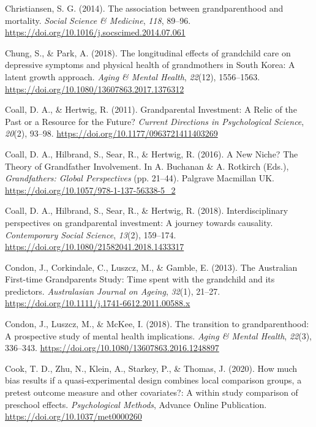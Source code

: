 \documentclass[
  english,
  man,floatsintext]{apa7}
\begin{document}
\leavevmode\hypertarget{ref-christiansenAssociationGrandparenthoodMortality2014}{}%
Christiansen, S. G. (2014). The association between grandparenthood and mortality. \emph{Social Science \& Medicine}, \emph{118}, 89--96. \url{https://doi.org/10.1016/j.socscimed.2014.07.061}

\leavevmode\hypertarget{ref-chungLongitudinalEffectsGrandchild2018}{}%
Chung, S., \& Park, A. (2018). The longitudinal effects of grandchild care on depressive symptoms and physical health of grandmothers in South Korea: A latent growth approach. \emph{Aging \& Mental Health}, \emph{22}(12), 1556--1563. \url{https://doi.org/10.1080/13607863.2017.1376312}

\leavevmode\hypertarget{ref-coallGrandparentalInvestmentRelic2011}{}%
Coall, D. A., \& Hertwig, R. (2011). Grandparental Investment: A Relic of the Past or a Resource for the Future? \emph{Current Directions in Psychological Science}, \emph{20}(2), 93--98. \url{https://doi.org/10.1177/0963721411403269}

\leavevmode\hypertarget{ref-coallNewNicheTheory2016}{}%
Coall, D. A., Hilbrand, S., Sear, R., \& Hertwig, R. (2016). A New Niche? The Theory of Grandfather Involvement. In A. Buchanan \& A. Rotkirch (Eds.), \emph{Grandfathers: Global Perspectives} (pp. 21--44). Palgrave Macmillan UK. \url{https://doi.org/10.1057/978-1-137-56338-5_2}

\leavevmode\hypertarget{ref-coallInterdisciplinaryPerspectivesGrandparental2018}{}%
Coall, D. A., Hilbrand, S., Sear, R., \& Hertwig, R. (2018). Interdisciplinary perspectives on grandparental investment: A journey towards causality. \emph{Contemporary Social Science}, \emph{13}(2), 159--174. \url{https://doi.org/10.1080/21582041.2018.1433317}

\leavevmode\hypertarget{ref-condonAustralianFirsttimeGrandparents2013}{}%
Condon, J., Corkindale, C., Luszcz, M., \& Gamble, E. (2013). The Australian First-time Grandparents Study: Time spent with the grandchild and its predictors. \emph{Australasian Journal on Ageing}, \emph{32}(1), 21--27. \url{https://doi.org/10.1111/j.1741-6612.2011.00588.x}

\leavevmode\hypertarget{ref-condonTransitionGrandparenthoodProspective2018}{}%
Condon, J., Luszcz, M., \& McKee, I. (2018). The transition to grandparenthood: A prospective study of mental health implications. \emph{Aging \& Mental Health}, \emph{22}(3), 336--343. \url{https://doi.org/10.1080/13607863.2016.1248897}

\leavevmode\hypertarget{ref-cookHowMuchBias2020}{}%
Cook, T. D., Zhu, N., Klein, A., Starkey, P., \& Thomas, J. (2020). How much bias results if a quasi-experimental design combines local comparison groups, a pretest outcome measure and other covariates?: A within study comparison of preschool effects. \emph{Psychological Methods}, Advance Online Publication. \url{https://doi.org/10.1037/met0000260}
\end{document}
